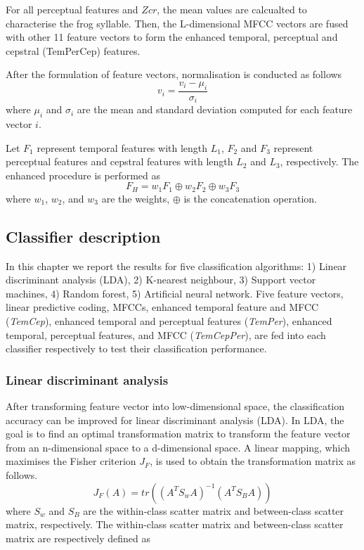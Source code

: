 For all perceptual features and $Zcr$, the mean values are calcualted to characterise the frog syllable. Then, the L-dimensional MFCC vectors are fused with other 11 feature vectors to form the enhanced temporal, perceptual and cepstral (TemPerCep) features.

After the formulation of feature vectors, normalisation is conducted as follows
\begin{equation}
v_{i} = \frac{v_{i}-\mu_{i}}{\sigma_{i}}
\end{equation} 
where $\mu_{i}$ and $\sigma_{i}$ are the mean and standard deviation computed for each feature vector $i$.  

Let $F_{1}$ represent temporal features with length $L_{1}$, $F_{2}$ and $F_{3}$ represent perceptual features and cepstral features with length $L_{2}$ and $L_{3}$, respectively. The enhanced procedure is performed as
\begin{equation}
F_{H} = w_{1}F_{1}\oplus w_{2}F_{2} \oplus w_{3}F_{3}
\end{equation} 
where $w_{1}$, $w_{2}$, and $w_{3}$ are the weights, $\oplus$ is the concatenation operation.


\subsection{Classifier description}
In this chapter we report the results for five classification algorithms: 1) Linear discriminant analysis (LDA), 2) K-nearest neighbour, 3) Support vector machines, 4) Random forest, 5) Artificial neural network. Five feature vectors, linear predictive coding, MFCCs, enhanced temporal feature and MFCC (\textit{TemCep}), enhanced temporal and perceptual features (\textit{TemPer}), enhanced temporal, perceptual features, and MFCC (\textit{TemCepPer}), are fed into each classifier respectively to test their classification performance.

\subsubsection{Linear discriminant analysis}
After transforming feature vector into low-dimensional space, the classification accuracy can be improved for linear discriminant analysis (LDA). In LDA, the goal is to find an optimal transformation matrix to transform the feature vector from an n-dimensional space to a d-dimensional space. A linear mapping, which maximises the Fisher criterion $J_{F}$, is used to obtain the transformation matrix as follows.
\begin{equation}
J_{F}(A)=tr((A^{T}S_{w}A)^{-1}(A^{T}S_{B}A))
\end{equation}
where $S_{w}$ and $S_{B}$ are the within-class scatter matrix and between-class scatter matrix, respectively. The within-class scatter matrix and between-class scatter matrix are respectively defined as 

